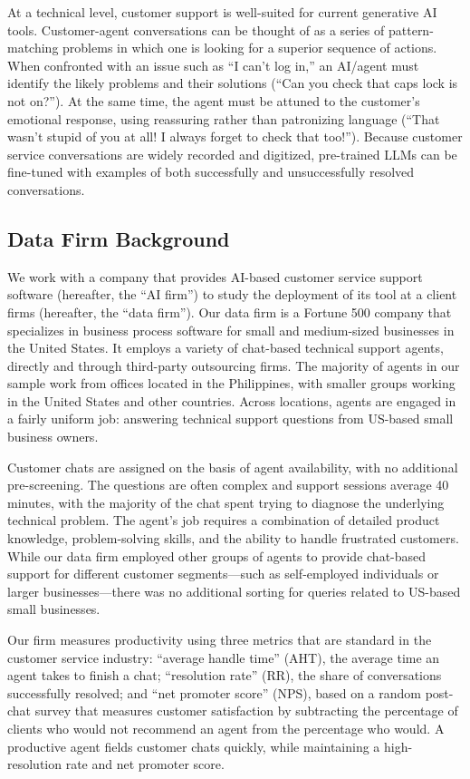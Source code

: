 \documentclass[11pt]{article}
\begin{document}
At a technical level, customer support is well-suited for current generative AI tools.  Customer-agent conversations can be thought of as a series of pattern-matching problems in which one is looking for a superior sequence of actions.  When confronted with an issue such as ``I can't log in,'' an AI/agent must identify the likely problems and their solutions (``Can you check that caps lock is not on?'').  At the same time, the agent must be attuned to the customer's emotional response, using reassuring rather than patronizing language (``That wasn't stupid of you at all!  I always forget to check that too!''). Because customer service conversations are widely recorded and digitized, pre-trained LLMs can be fine-tuned with examples of both successfully and unsuccessfully resolved conversations. 

\subsection{Data Firm Background} 

We work with a company that provides AI-based customer service support software (hereafter, the ``AI firm'') to study the deployment of its tool at a client firms (hereafter, the ``data firm''). Our data firm is a Fortune 500 company that specializes in business process software for small and medium-sized businesses in the United States.  It employs a variety of chat-based technical support agents, directly and through third-party outsourcing firms.  The majority of agents in our sample work from offices located in the Philippines, with smaller groups working in the United States and  other countries.  Across locations, agents are engaged in a fairly uniform job: answering technical support questions from US-based small business owners.

Customer chats are assigned on the basis of agent availability, with no additional pre-screening.  The questions are often complex and support sessions average 40 minutes, with the majority of the chat spent trying to diagnose the underlying technical problem. The agent's job requires a combination of detailed product knowledge, problem-solving skills, and the ability to handle frustrated customers. While our data firm employed other groups of agents to provide chat-based support for different customer segments---such as self-employed individuals or larger businesses---there was no additional sorting for queries related to US-based small businesses.

Our firm measures productivity using three metrics that are standard in the customer service industry: ``average handle time'' (AHT), the average time an agent takes to finish a chat; ``resolution rate'' (RR), the share of conversations successfully resolved; and ``net promoter score'' (NPS), based on a random post-chat survey that measures customer satisfaction by subtracting the percentage of clients who would not recommend an agent from the percentage who would. A productive agent fields customer chats quickly, while maintaining a high-resolution rate and net promoter score. 
\end{document}
